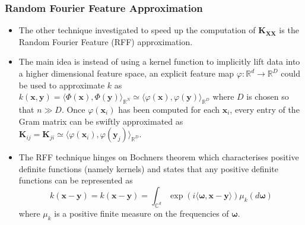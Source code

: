 \documentclass[9pt,hyperref={pdfpagelabels=false},xcolor=table]{beamer}
\begin{document}
\begin{frame}
    \frametitle{Random Fourier Feature Approximation}
    \begin{itemize}
        \item The other technique investigated to speed up the computation of $\bm{K_{XX}}$ is the Random Fourier Feature (RFF) approximation.
        \item The main idea is instead of using a kernel function to implicitly lift data into a higher dimensional feature space, an explicit feature map $\varphi : \mathbb{R}^d \to \mathbb{R}^D$ could be used to approximate $k$ as $k \left( \bm{x} , \bm{y} \right) = \langle \Phi (\bm{x}) , \Phi (\bm{y}) \rangle_{\mathbb{R}^N} \simeq \langle \varphi (\bm{x}) , \varphi (\bm{y}) \rangle_{\mathbb{R}^D}$ where $D$ is chosen so that $n \gg  D$. Once $\varphi (\bm{x}_i)$ has been computed for each $\bm{x}_i$, every entry of the Gram matrix can be swiftly approximated as $\bm{K}_{ij} = \bm{K}_{ji} \simeq \langle \varphi (\bm{x}_i) , \varphi (\bm{y}_j) \rangle_{\mathbb{R}^D}$.
        \item The RFF technique hinges on Bochners theorem which characterises positive definite functions (namely kernels) and states that any positive definite functions can be represented as
              \[
                  k \left( \bm{x} - \bm{y} \right) = k \left( \bm{x} - \bm{y} \right) = \int_{\mathbb{C}^d} \exp \left( i \langle \bm{\omega} , \bm{x} - \bm{y} \rangle \right) \mu_k \left( d \bm{\omega} \right)
              \]
              where $\mu_k$ is a positive finite measure on the frequencies of $\bm{\omega}$.
    \end{itemize}
\end{frame}
\end{document}
